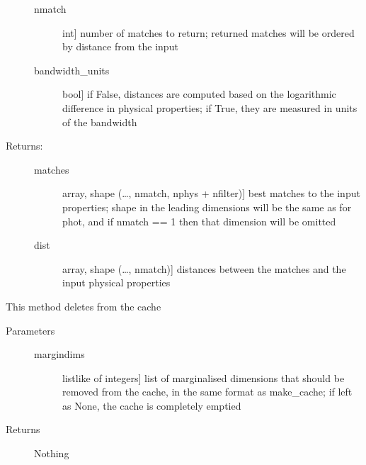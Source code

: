 \documentclass[letterpaper,10pt,english]{sphinxmanual}
\begin{document}
\begin{fulllineitems}
\begin{fulllineitems}
\begin{description}
\begin{description}
\item[{nmatch}] \leavevmode{[}int{]}
number of matches to return; returned matches will be
ordered by distance from the input

\item[{bandwidth\_units}] \leavevmode{[}bool{]}
if False, distances are computed based on the
logarithmic difference in physical properties; if True,
they are measured in units of the bandwidth

\end{description}

\item[{Returns:}] \leavevmode\begin{description}
\item[{matches}] \leavevmode{[}array, shape (…, nmatch, nphys + nfilter){]}
best matches to the input properties; shape in the
leading dimensions will be the same as for phot, and if
nmatch == 1 then that dimension will be omitted

\item[{dist}] \leavevmode{[}array, shape (…, nmatch){]}
distances between the matches and the input physical
properties

\end{description}

\end{description}

\end{fulllineitems}


\begin{fulllineitems}
\label{\detokenize{bayesphot:slugpy.bayesphot.bp.bp.clear_cache}}
This method deletes from the cache
\begin{description}
\item[{Parameters}] \leavevmode\begin{description}
\item[{margindims}] \leavevmode{[}listlike of integers{]}
list of marginalised dimensions that should be removed
from the cache, in the same format as make\_cache; if
left as None, the cache is completely emptied

\end{description}

\item[{Returns}] \leavevmode
Nothing

\end{description}


\end{fulllineitems}
\end{fulllineitems}
\end{document}
